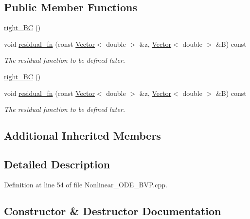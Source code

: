 \subsection*{Public Member Functions}
\begin{DoxyCompactItemize}
\item 
\hyperlink{classLuna_1_1right__BC_af63a57e305306468e26f7bdb5842e1e6}{right\+\_\+\+BC} ()
\item 
void \hyperlink{classLuna_1_1right__BC_a513bb865a218a9ee309727839496afe0}{residual\+\_\+fn} (const \hyperlink{classLuna_1_1Vector}{Vector}$<$ double $>$ \&z, \hyperlink{classLuna_1_1Vector}{Vector}$<$ double $>$ \&B) const
\begin{DoxyCompactList}\small\item\em The residual function to be defined later. \end{DoxyCompactList}\item 
\hyperlink{classLuna_1_1right__BC_af63a57e305306468e26f7bdb5842e1e6}{right\+\_\+\+BC} ()
\item 
void \hyperlink{classLuna_1_1right__BC_a513bb865a218a9ee309727839496afe0}{residual\+\_\+fn} (const \hyperlink{classLuna_1_1Vector}{Vector}$<$ double $>$ \&z, \hyperlink{classLuna_1_1Vector}{Vector}$<$ double $>$ \&B) const
\begin{DoxyCompactList}\small\item\em The residual function to be defined later. \end{DoxyCompactList}\end{DoxyCompactItemize}
\subsection*{Additional Inherited Members}


\subsection{Detailed Description}


Definition at line 54 of file Nonlinear\+\_\+\+O\+D\+E\+\_\+\+B\+V\+P.\+cpp.



\subsection{Constructor \& Destructor Documentation}
\mbox{\label{classLuna_1_1right__BC_af63a57e305306468e26f7bdb5842e1e6}} 
